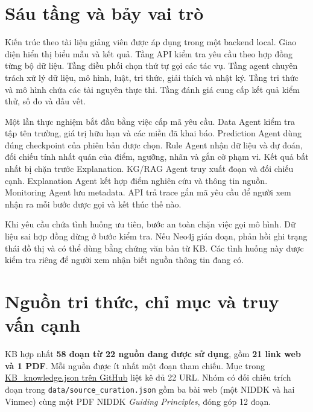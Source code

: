 
\section{Sáu tầng và bảy vai trò}
Kiến trúc theo tài liệu giảng viên \cite{architecture-v2} được áp dụng trong một backend local. Giao diện hiển thị biểu mẫu và kết quả. Tầng API kiểm tra yêu cầu theo hợp đồng từng bộ dữ liệu. Tầng điều phối chọn thứ tự gọi các tác vụ. Tầng agent chuyên trách xử lý dữ liệu, mô hình, luật, tri thức, giải thích và nhật ký. Tầng tri thức và mô hình chứa các tài nguyên thực thi. Tầng đánh giá cung cấp kết quả kiểm thử, số đo và dấu vết.



Một lần thực nghiệm bắt đầu bằng việc cấp mã yêu cầu. Data Agent kiểm tra tập tên trường, giá trị hữu hạn và các miền đã khai báo. Prediction Agent dùng đúng checkpoint của phiên bản được chọn. Rule Agent nhận dữ liệu và dự đoán, đối chiếu tính nhất quán của điểm, ngưỡng, nhãn và gắn cờ phạm vi. Kết quả bất nhất bị chặn trước Explanation. KG/RAG Agent truy xuất đoạn và đối chiếu cạnh. Explanation Agent kết hợp điểm nghiên cứu và thông tin nguồn. Monitoring Agent lưu metadata. API trả trace gắn mã yêu cầu để người xem nhận ra mỗi bước được gọi và kết thúc thế nào.

Khi yêu cầu chứa tình huống ưu tiên, bước an toàn chặn việc gọi mô hình. Dữ liệu sai hợp đồng dừng ở bước kiểm tra. Nếu Neo4j gián đoạn, phản hồi ghi trạng thái đồ thị và có thể dùng bằng chứng văn bản từ KB. Các tình huống này được kiểm tra riêng để người xem nhận biết nguồn thông tin đang có.

\section{Nguồn tri thức, chỉ mục và truy vấn cạnh}
KB hợp nhất \textbf{58 đoạn từ 22 nguồn đang được sử dụng}, gồm \textbf{21 link web và 1 PDF}. Mỗi nguồn được ít nhất một đoạn tham chiếu. Mục  trong \href{https://github.com/jellalaz/He_Thong_Thong_Minh_Thay_Que/blob/main/exports/KB_KG_RAG/KB_knowledge.json}{KB\_knowledge.json trên GitHub} liệt kê đủ 22 URL. Nhóm có đối chiếu trích đoạn trong \nolinkurl{data/source_curation.json} gồm ba bài web (một NIDDK và hai Vinmec) cùng một PDF NIDDK \emph{Guiding Principles}, đóng góp 12 đoạn.

